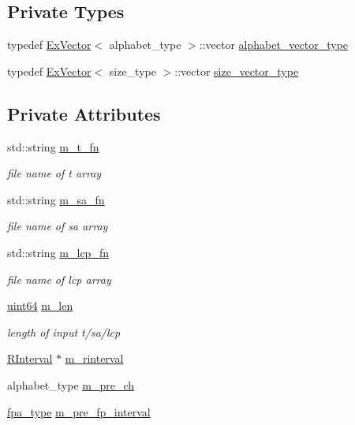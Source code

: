 \subsection*{Private Types}
\begin{DoxyCompactItemize}
\item 
typedef \hyperlink{struct_ex_vector}{Ex\+Vector}$<$ alphabet\+\_\+type $>$\+::vector \hyperlink{class_validate_a0323dd6f1096806748299dfd4f644b69}{alphabet\+\_\+vector\+\_\+type}
\item 
typedef \hyperlink{struct_ex_vector}{Ex\+Vector}$<$ size\+\_\+type $>$\+::vector \hyperlink{class_validate_a3725fcfd4a55e4d8edc8b5d5955c081d}{size\+\_\+vector\+\_\+type}
\end{DoxyCompactItemize}
\subsection*{Private Attributes}
\begin{DoxyCompactItemize}
\item 
std\+::string \hyperlink{class_validate_a8038ca0a43b122fd9e08af72d7789611}{m\+\_\+t\+\_\+fn}
\begin{DoxyCompactList}\small\item\em file name of t array \end{DoxyCompactList}\item 
std\+::string \hyperlink{class_validate_aa7c887cf55845b0214e8db3af1076283}{m\+\_\+sa\+\_\+fn}
\begin{DoxyCompactList}\small\item\em file name of sa array \end{DoxyCompactList}\item 
std\+::string \hyperlink{class_validate_a8bbe1b0a3990ebae85d352bcce9da755}{m\+\_\+lcp\+\_\+fn}
\begin{DoxyCompactList}\small\item\em file name of lcp array \end{DoxyCompactList}\item 
\hyperlink{types_8h_a60e8696a4678cd348e991a1f172e53f7}{uint64} \hyperlink{class_validate_a49a048e8046e03c3fbc7251bb9af87fd}{m\+\_\+len}
\begin{DoxyCompactList}\small\item\em length of input t/sa/lcp \end{DoxyCompactList}\item 
\hyperlink{struct_validate_1_1_r_interval}{R\+Interval} $\ast$ \hyperlink{class_validate_aaa32f94ddccccccd3d86897996c323cc}{m\+\_\+rinterval}
\item 
alphabet\+\_\+type \hyperlink{class_validate_abc933d4475a6b952888ee423c3228fc9}{m\+\_\+pre\+\_\+ch}
\item 
\hyperlink{common_8h_a7fdaf8b9b3d2f6ae6b10597a8d3f96ee}{fpa\+\_\+type} \hyperlink{class_validate_a767b5f07008091d4191201c07ad9a3cd}{m\+\_\+pre\+\_\+fp\+\_\+interval}
\end{DoxyCompactItemize}


